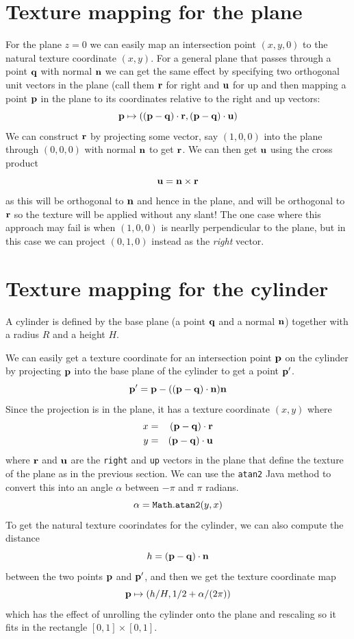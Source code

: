 \documentclass{book}
\newcommand{\vect}[1]{{\bf{ #1}}}
\begin{document}
\section{Texture mapping for the plane}
For the plane $z=0$ we can easily map an intersection point $(x,y,0)$ to the
natural texture coordinate $(x,y)$. For a general plane that passes through
a point ${\vect q}$ with normal ${\vect n}$ we can get the same effect by specifying two
orthogonal unit vectors in the plane (call them ${\vect r}$ for right and ${\vect u}$ for up
and then mapping a point ${\vect p}$ in the plane to its coordinates relative to the right and up
vectors:
\[
{\vect p} \mapsto (({\vect p}-{\vect q})\cdot {\vect r}, {(\vect p}-{\vect q})\cdot {\vect u})
\]
We can construct ${\vect r}$ by projecting some vector, say $(1,0,0)$ into the plane through $(0,0,0)$
with normal ${\vect n}$ to get ${\vect r}$. We can then get ${\vect u}$ using the cross product
\[
{\vect u} = {\vect n}\times{\vect r}
\]
as this will be orthogonal to ${\vect n}$ and hence in the plane, and will be orthogonal to ${\vect r}$
so the texture will be applied without any slant!  The one case where this approach may fail is when
$(1,0,0)$ is nearlly perpendicular to the plane, but in this case we can project $(0,1,0)$ instead as the
{\it right} vector.

\section{Texture mapping for the cylinder}
A cylinder is defined by the base plane (a point ${\vect q}$ and a normal ${\vect n}$) together with
a radius $R$ and a height $H$.

We can easily get a texture coordinate for an intersection point ${\vect p}$ on the cylinder by
projecting ${\vect p}$ into the base plane of the cylinder to get a point ${\vect p}'$.
\[
{\vect p}' =
{\vect p} -
(({\vect p} - {\vect q}) \cdot {\vect n})
{\vect n}
\]
Since the
projection is in the plane, it has a texture coordinate $(x,y)$ where
\begin{eqnarray*}
x &=& ({\vect p}-{\vect q})\cdot {\vect r} \\
y &=& ({\vect p}-{\vect q})\cdot {\vect u}
\end{eqnarray*}
where ${\vect r}$ and ${\vect u}$ are the {\tt right} and {\tt up} vectors
in the plane that define the texture of the plane as in the previous section.
We can use the {\tt atan2}
Java method to convert this into an angle $\alpha$ between $-\pi$ and $\pi$ radians.
\[
\alpha = {\tt Math.atan2}(y,x)
\]
To get the natural
texture coorindates for the cylinder, we can also compute the distance
\[
h = ({\vect p}- {\vect q})\cdot {\vect n}
\]
between the two points ${\vect p}$ and ${\vect p}'$, and then we get the texture coordinate
map
\[
{\vect p} \mapsto (h/H,1/2 + \alpha/(2\pi))
\]
which has the effect of unrolling the cylinder onto the plane and rescaling so it fits in the rectangle $[0,1]\times[0,1]$.
\end{document}
